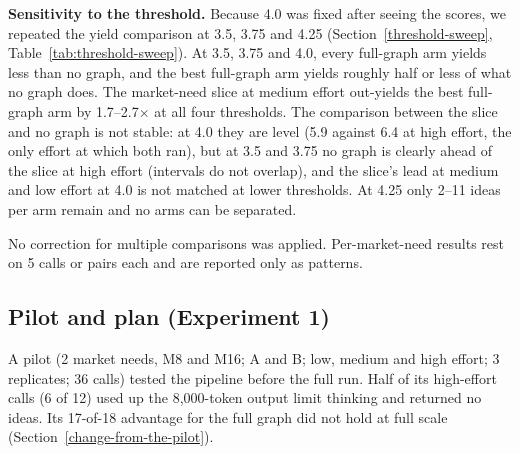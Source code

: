 \textbf{Sensitivity to the threshold.} Because 4.0 was fixed after seeing the scores, we repeated the yield comparison at 3.5, 3.75 and 4.25 (Section~\ref{threshold-sweep}, Table~\ref{tab:threshold-sweep}). At 3.5, 3.75 and 4.0, every full-graph arm yields less than no graph, and the best full-graph arm yields roughly half or less of what no graph does. The market-need slice at medium effort out-yields the best full-graph arm by 1.7--2.7$\times$ at all four thresholds. The comparison between the slice and no graph is not stable: at 4.0 they are level (5.9 against 6.4 at high effort, the only effort at which both ran), but at 3.5 and 3.75 no graph is clearly ahead of the slice at high effort (intervals do not overlap), and the slice's lead at medium and low effort at 4.0 is not matched at lower thresholds. At 4.25 only 2--11 ideas per arm remain and no arms can be separated.

No correction for multiple comparisons was applied. Per-market-need results rest on 5 calls or pairs each and are reported only as patterns.

\hypertarget{what-was-planned-and-what-was-not}{%
\subsection{Pilot and plan (Experiment 1)}\label{what-was-planned-and-what-was-not}\label{pilot}}

A pilot (2 market needs, M8 and M16; A and B; low, medium and high effort; 3 replicates; 36 calls) tested the pipeline before the full run. Half of its high-effort calls (6 of 12) used up the 8,000-token output limit thinking and returned no ideas. Its 17-of-18 advantage for the full graph did not hold at full scale (Section~\ref{change-from-the-pilot}).

